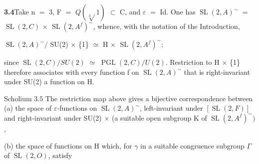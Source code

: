 \documentclass[10pt,a4paper]{article}
\begin{document}
\par\noindent\textbf{3.4}\quad Take n $=$ 3, F $=$ $Q(\sqrt[3]{}1)$ $\subset{}$ C, and $\varepsilon{}$ $=$ Id. One has $\operatorname{SL}(2,A)^\sim$ $=$ $\operatorname{SL}(2,C)$ $\times{}$ $\operatorname{SL}(2,A^f)^\sim$, whence, with the notation of the Introduction,\par
\par\smallskip\begin{center}\begin{minipage}{0.96\textwidth}\centering
$\operatorname{SL}(2,A)^\sim/$ SU(2) $\times{}$ \{1\} $\simeq{}$ H $\times{}$ $\operatorname{SL}(2,A^f)^\sim$;
\end{minipage}\end{center}\smallskip
\par since $\operatorname{SL}(2,C)/SU(2)$ $\simeq{}$ $\operatorname{PGL}(2,C)/U(2)$. Restriction to H $\times{}$ \{1\} therefore associates with every function f on $\operatorname{SL}(2,A)^\sim$ that is right-invariant under SU(2) a function on H.\par
\par Scholium $3.5$ The restriction map above gives a bijective correspondence between (a) the space of $\varepsilon{}$-functions on $\operatorname{SL}(2,A)^\sim$, left-invariant under $[\operatorname{SL}(2,F)]$ and right-invariant under SU(2) $\times{}$ (a suitable open subgroup K of $\operatorname{SL}(2,A^f)^\sim)$,\par
\par (b) the space of functions on H which, for $\gamma{}$ in a suitable congruence subgroup $\Gamma{}$ of $\operatorname{SL}(2,O)$, satisfy\par
\end{document}
